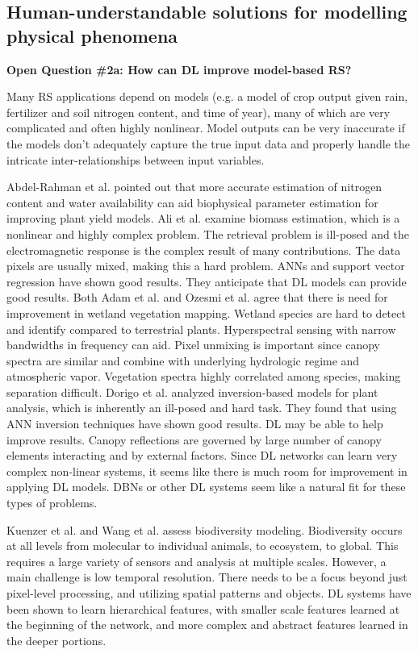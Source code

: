 \documentclass[12pt]{spieman}
\begin{document}
\begin{spacing}{1}
\subsection{Human-understandable solutions for modelling physical phenomena}
\label{subsec:ChallengesOpportunities_ii}
\textbf{Open Question \#2a: How can DL improve model-based RS?}

Many RS applications depend on models (e.g. a model of crop output given rain, fertilizer and soil nitrogen content, and time of year), many of which are very complicated and often highly nonlinear. Model outputs can be very inaccurate if the models don't adequately capture the true input data and properly handle the intricate inter-relationships between input variables.

Abdel-Rahman et al. \cite{abdel2008application} pointed out that more accurate estimation of nitrogen content and water availability can aid biophysical parameter estimation for improving plant yield models. Ali et al. \cite{Ali201Review} examine biomass estimation, which is a nonlinear and highly complex problem. The retrieval problem is ill-posed and the electromagnetic response is the complex result of many contributions. The data pixels are usually mixed, making this a hard problem. ANNs and support vector regression have shown good results. They anticipate that DL models can provide good results. Both Adam et al. \cite{Adam2010MultiSpectral} and Ozesmi et al. \cite{ozesmi2002satellite} agree that there is need for improvement in wetland vegetation mapping. Wetland species are hard to detect and identify compared to terrestrial plants. Hyperspectral sensing with narrow bandwidths in frequency can aid. Pixel unmixing is important since canopy spectra are similar and combine with underlying hydrologic regime and atmospheric vapor. Vegetation spectra highly correlated among species, making separation difficult. Dorigo et al. \cite{dorigo2007review} analyzed inversion-based models for plant analysis, which is inherently an ill-posed and hard task. They found that using ANN inversion techniques have shown good results. DL may be able to help improve results. Canopy reflections are governed by large number of canopy elements interacting and by external factors. Since DL networks can learn very complex non-linear systems, it seems like there is much room for improvement in applying DL models. DBNs or other DL systems seem like a natural fit for these types of problems.

Kuenzer et al. \cite{kuenzer2014earth} and Wang et al. \cite{wang2010remote} assess biodiversity modeling. Biodiversity occurs at all levels from molecular to individual animals, to ecosystem, to global. This requires a large variety of sensors and analysis at multiple scales. However, a main challenge is low temporal resolution. There needs to be a focus beyond just pixel-level processing, and utilizing spatial patterns and objects. DL systems have been shown to learn hierarchical features, with smaller scale features learned at the beginning of the network, and more complex and abstract features learned in the deeper portions. \\


\end{spacing}
\end{document}
